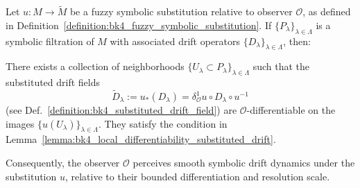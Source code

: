 \begin{lemma}
\label{lemma:bk4_observer_relative_smoothness}
Let $u : M \to \tilde{M}$ be a fuzzy symbolic substitution relative to observer $\mathcal{O}$, as defined in Definition~\ref{definition:bk4_fuzzy_symbolic_substitution}. If $\{P_\lambda\}_{\lambda \in \Lambda}$ is a symbolic filtration of $M$ with associated drift operators $\{D_\lambda\}_{\lambda \in \Lambda}$, then:

There exists a collection of neighborhoods $\{U_\lambda \subset P_\lambda\}_{\lambda \in \Lambda}$ such that the substituted drift fields
\[
\tilde{D}_\lambda := u_*(D_\lambda) = \delta^1_\mathcal{O}u \circ D_\lambda \circ u^{-1}
\]
(see Def.~\ref{definition:bk4_substituted_drift_field}) are $\mathcal{O}$-differentiable on the images $\{u(U_\lambda)\}_{\lambda \in \Lambda}$.
They satisfy the condition in Lemma~\ref{lemma:bk4_local_differentiability_substituted_drift}.

Consequently, the observer $\mathcal{O}$ perceives smooth symbolic drift dynamics under the substitution $u$, relative to their bounded differentiation and resolution scale.
\end{lemma}
